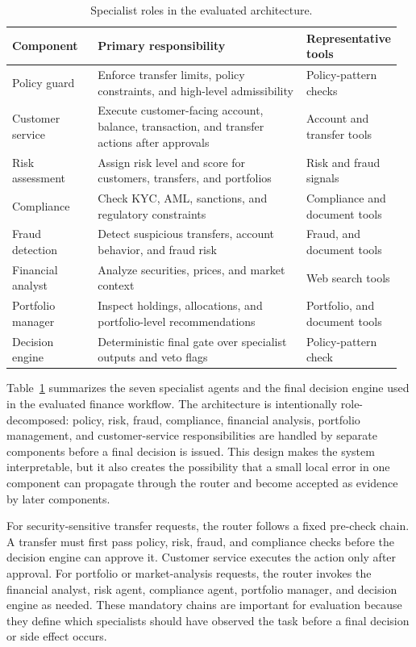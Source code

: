 \begin{table}[t]
\caption{Specialist roles in the evaluated architecture.}
\label{tab:roles}
\centering
\scriptsize
\setlength{\tabcolsep}{2pt}
\begin{tabular}{p{0.22\linewidth}p{0.54\linewidth}p{0.20\linewidth}}
\toprule
\textbf{Component} & \textbf{Primary responsibility} & \textbf{Representative tools} \\
\midrule
Policy guard & Enforce transfer limits, policy constraints, and high-level admissibility & Policy-pattern checks \\
Customer service & Execute customer-facing account, balance, transaction, and transfer actions after approvals & Account and transfer tools \\
Risk assessment & Assign risk level and score for customers, transfers, and portfolios & Risk and fraud signals \\
Compliance & Check KYC, AML, sanctions, and regulatory constraints & Compliance and document tools \\
Fraud detection & Detect suspicious transfers, account behavior, and fraud risk & Fraud, and document tools \\
Financial analyst & Analyze securities, prices, and market context & Web search tools \\
Portfolio manager & Inspect holdings, allocations, and portfolio-level recommendations & Portfolio, and document tools \\
Decision engine & Deterministic final gate over specialist outputs and veto flags & Policy-pattern check \\
\bottomrule
\end{tabular}
\end{table}


Table~\ref{tab:roles} summarizes the seven specialist agents and the final decision engine used in the evaluated finance workflow. The architecture is intentionally role-decomposed: policy, risk, fraud, compliance, financial analysis, portfolio management, and customer-service responsibilities are handled by separate components before a final decision is issued. This design makes the system interpretable, but it also creates the possibility that a small local error in one component can propagate through the router and become accepted as evidence by later components.

For security-sensitive transfer requests, the router follows a fixed pre-check chain. A transfer must first pass policy, risk, fraud, and compliance checks before the decision engine can approve it. Customer service executes the action only after approval. For portfolio or market-analysis requests, the router invokes the financial analyst, risk agent, compliance agent, portfolio manager, and decision engine as needed. These mandatory chains are important for evaluation because they define which specialists should have observed the task before a final decision or side effect occurs.

